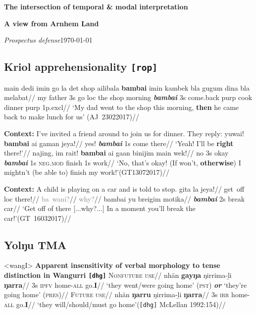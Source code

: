 \documentclass[10pt]{article}
\author{Josh}
\date{\today}
\begin{document}
\Large\textbf{The intersection of temporal \& modal interpretation}

\large\textbf{A view from Arnhem Land}


\small\textit{Prospectus defense}\hfill\today

\subsection*{Kriol apprehensionality \texttt{[rop]}}

\pex\label{ssq0}\begingl
\gla main dedi imin go la det shop ailibala \textbf{bambai} imin kambek bla gugum dina bla melabat//
\glb my father 3s go {\sc loc} the shop morning \textit{\textbf{bambai}} 3s come.back {\sc purp} cook dinner {\sc purp} 1p{\sc.excl}//
\glft`My dad went to the shop this morning, \textbf{then} he came back to make lunch for us' \hspace*{\fill}(AJ~23022017)//
\endgl\xe

\pex\textbf{Context:} I've invited a friend around to join us for dinner. They reply:	
\a\begingl{}
\gla yuwai! \textbf{bambai} ai gaman jeya!//
\glb yes! \textit{\textbf{bambai}} 1s come there//
\glft `Yeah! I'll be \textbf{right} there!'//
\endgl
\a{}\begingl{}
\gla najing, im rait! \textbf{bambai} ai gaan binijim main wek!//
\glb no 3s okay \textit{\textbf{bambai}} 1s \textsc{neg.mod} finish 1s work//
\glft`No, that's okay! (If won't, \textbf{otherwise}) I mightn't (be able to) finish my work!'\hfill(GT13072017)//\endgl\xe

\pex\textbf{Context:} A child is playing on a car and is told to stop.
\a	\begingl 	\gla gita la jeya!//
\glb get~off {\sc loc} there!//
\endgl
\a[label=\textcolor{gray}{B}]\begingl\gla \textcolor{gray}{ba~wani?}//
\glb \textcolor{gray}{why?}//
\endgl
\a[label=A]\begingl
\gla bambai yu breigim motika//
\glb \textbf{\textit{bambai}} 2s break car//
\glft `Get off of there [...why?...] In a moment you'll break the car!'\hspace*{\fill}(GT~16032017)//\endgl\xe

\subsection*{Yolŋu TMA}
\pex<wangI>\label{wangI} \textbf{Apparent insensitivity of verbal morphology to tense distinction in Wangurri \texttt{[dhg]}}
\a\begingl
\glpreamble \textsc{Nonfuture use}//
\gla nhän \textbf{gayŋa} ŋirrima-ḻi \textbf{ŋarra}//
\glb 3s \textsc{ipfv} home-\textsc{all} go.\textbf{I}//
\glft`they went/were going home' (\textsc{pst}) \textbf{\textit{or}} `they're going home' (\textsc{pres})//
\endgl 
\a\begingl \glpreamble\textsc{Future use}//
\gla nhän \textbf{ŋarru} ŋirrima-ḻi \textbf{ŋarra}//
\glb 3s \textsc{irr} home-\textsc{all} go.\textbf{I}//
\glft`they will/should/must go home'\hfill(\texttt{[dhg]} McLellan 1992:154)//
\endgl
\xe
\end{document}
